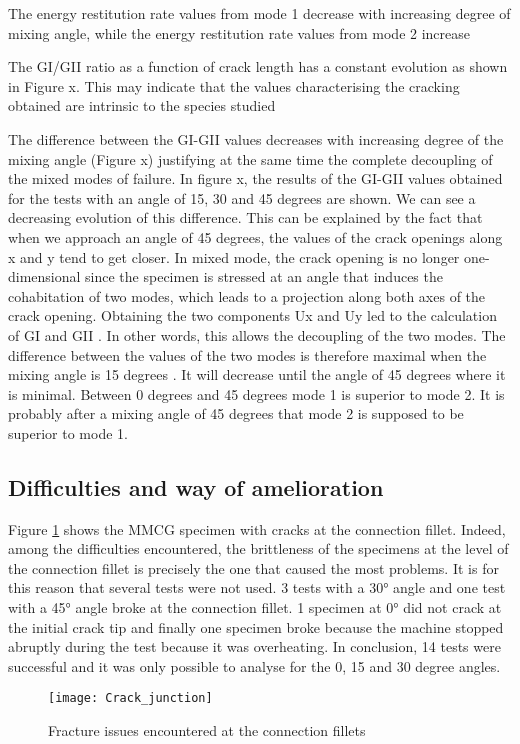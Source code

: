 The energy restitution rate values from mode 1 decrease with increasing degree of mixing angle, while the energy restitution rate values from mode 2 increase

The GI/GII ratio as a function of crack length has a constant evolution as shown in Figure x. This may indicate that the values characterising the cracking obtained are intrinsic to the species studied

The difference between the GI-GII values decreases with increasing degree of the mixing angle (Figure x) justifying at the same time the complete decoupling of the mixed modes of failure. In figure x, the results of the GI-GII values obtained for the tests with an angle of 15, 30 and 45 degrees are shown. We can see a decreasing evolution of this difference. This can be explained by the fact that when we approach an angle of 45 degrees, the values of the crack openings along x and y tend to get closer. In mixed mode, the crack opening is no longer one-dimensional since the specimen is stressed at an angle that induces the cohabitation of two modes, which leads to a projection along both axes of the crack opening. Obtaining the two components Ux and Uy led to the calculation of GI and GII . In other words, this allows the decoupling of the two modes. The difference between the values of the two modes is therefore maximal when the mixing angle is 15 degrees . It will decrease until the angle of 45 degrees where it is minimal. Between 0 degrees and 45 degrees mode 1 is superior to mode 2. It is probably after a mixing angle of 45 degrees that mode 2 is supposed to be superior to mode 1.

\subsection{Difficulties and way of amelioration}

Figure \ref{fig:Crack_junction} shows the MMCG specimen with cracks at the connection fillet. Indeed, among the difficulties encountered, the brittleness of the specimens at the level of the connection fillet is precisely the one that caused the most problems. It is for this reason that several tests were not used. 3 tests with a 30° angle and one test with a 45° angle broke at the connection fillet. 1 specimen at 0° did not crack at the initial crack tip and finally one specimen broke because the machine stopped abruptly during the test because it was overheating. In conclusion, 14 tests were successful and it was only possible to analyse for the 0, 15 and 30 degree angles.

\begin{figure}[htp]
	\centering
	\texttt{[image: Crack\_junction]}
	\caption{Fracture issues encountered at the connection fillets}
	\label{fig:Crack_junction}
\end{figure}